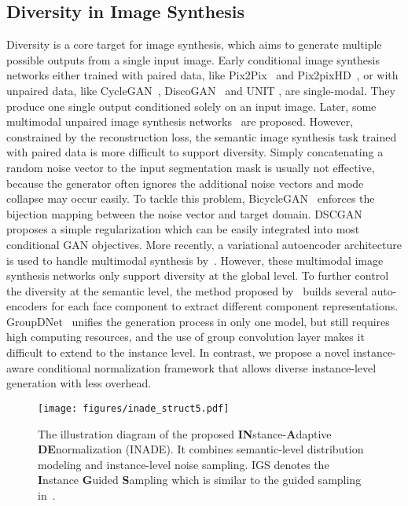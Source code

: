 \documentclass[final]{cvpr}
\begin{document}
\subsection{Diversity in Image Synthesis}
Diversity is a core target for image synthesis, which aims to generate multiple possible outputs from a single input image. Early conditional image synthesis networks either trained with paired data, like Pix2Pix~\cite{isola2017image} and Pix2pixHD~\cite{wang2018high}, or with unpaired data, like CycleGAN~\cite{zhu2017unpaired}, DiscoGAN~\cite{kim2017learning} and UNIT \cite{liu2017unsupervised}, are single-modal. They produce one single output conditioned solely on an input image. Later, some multimodal unpaired image synthesis networks~\cite{huang2018multimodal,lee2018diverse,almahairi2018augmented} are proposed. 
However, constrained by the reconstruction loss, the semantic image synthesis task trained with paired data is more difficult to support diversity. 
Simply concatenating a random noise vector to the input segmentation mask is usually not effective, because the generator often ignores the additional noise vectors and mode collapse may occur easily. To tackle this problem, BicycleGAN~\cite{zhu2017toward} enforces the bijection mapping between the noise vector and target domain. DSCGAN~\cite{yang2018diversity} proposes a simple regularization which can be easily integrated into most conditional GAN objectives. 
More recently, a variational autoencoder architecture is used to handle multimodal synthesis by~\cite{park2019semantic,tan2020semantic,liu2019learning}.
However, these multimodal image synthesis networks only support diversity at the global level. 
To further control the diversity at the semantic level, the method proposed by~\cite{gu2019mask} builds several auto-encoders for each face component to extract different component representations. 
GroupDNet~\cite{zhu2020semantically} unifies the generation process in only one model, but still requires high computing resources, and the use of group convolution layer makes it difficult to extend to the instance level.
In contrast, we propose a novel instance-aware conditional normalization framework that allows diverse instance-level generation with less overhead.

\begin{figure*}[t]
  \centering
  \texttt{[image: figures/inade\_struct5.pdf]}
  \caption{The illustration diagram of the proposed \textbf{IN}stance-\textbf{A}daptive \textbf{DE}normalization (INADE). It combines semantic-level distribution modeling and instance-level noise sampling. IGS denotes the \textbf{I}nstance \textbf{G}uided \textbf{S}ampling which is similar to the guided sampling in~\cite{tan2020semantic}.}
  \label{fig:INADE}
\end{figure*}
\end{document}
